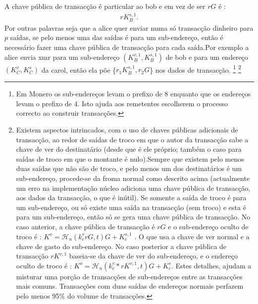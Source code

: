 A chave pública de transacção é particular ao bob e em vez de ser $r G$ é :
\begin{align*}
r K_B^{s,1} .
\end{align*}
Por outras palavras seja que a alice quer enviar numa só transacção dinheiro para $p$ saídas, se pelo menos uma das saídas é para um sub-endereço, então é necessário fazer uma chave pública de transacção para cada saída.\newline Por exemplo a alice envia xmr para um sub-endereço $(K_B^{v,1}, K_B^{s,1})$ de bob e para um endereço $(K_C^v, K_C^s)$ da carol, então ela põe \{$r_1 K_B^{s,1},r_2 G$\} nos dados de transacção.
\footnote{Em Monero os sub-endereços levam o prefixo de 8 enquanto que os endereços levam o prefixo de 4. Isto ajuda aos remetentes escolherem o processo correcto ao construir transacções.}
\footnote{Existem aspectos intrincados, com o uso de chaves públicas adicionais de transacção, ao redor de saídas de troco em que o autor da transacção sabe a chave de ver do destinatário (desde que é ele próprio; também o caso para saídas de troco em que o montante é nulo).\newline Sempre que existem pelo menos duas saídas que não são de troco, e pelo menos um dos destinatários é um sub-endereço, procede-se da froma normal como descrito acima (actualmente um erro na implementação núcleo adiciona uma chave pública de transacção, aos dados da transacção, o que é inútil).\newline
Se somente a saída de troco é para um sub-endereço, ou só existe uma saída na transacção (sem troco) e esta é para um sub-endereço, então só se gera uma chave pública de transacção. No caso anterior, a chave pública de transacção é $rG$ e o sub-endereço oculto de troco é : $K^o = \mathcal{H}_n(k^v_c r G,t)G + K_c^{s,1}$ . O que usa a chave de ver normal e a chave de gasto do sub-endereço. No caso posterior a chave pública de transacção $r K^{v,1}$ baseia-se da chave de ver do sub-endereço, e o endereço oculto de troco é : $K^o = \mathcal{H}_n(k^v_c*r K^{v,1},t)G + K_c^s$. Estes detalhes, ajudam a misturar uma porção de transacções de sub-endereços entre as transacções mais comuns. Transacções com duas saídas de endereços normais perfazem pelo menos 95\% do volume de transacções.} 
